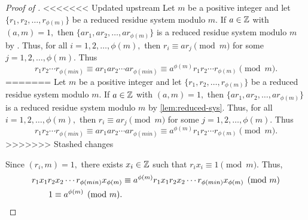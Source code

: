 \documentclass{ximera}
\begin{document}
\begin{proof}[Proof of ]
<<<<<<< Updated upstream
    Let $m$ be a positive integer and let $\{r_1,r_2,\dots,r_{\phi(m)}\}$ be a reduced residue system modulo $m.$ If $a\in\mathbb Z$ with $(a,m)=1,$ then $\{ar_1,ar_2,\dots,ar_{\phi(m)}\}$ is a reduced residue system modulo $m$ by . Thus, for all $i=1,2,\dots, \phi(m),$ then $r_i\equiv a r_j\pmod{m}$ for some $j=1,2,\dots,\phi(m).$ Thus \[r_1 r_2\cdots r_{\phi(min)}\equiv ar_1 ar_2\cdots ar_{\phi(min)}\equiv a^{\phi(m)}r_1 r_2\cdots r_{\phi(m)} \pmod{m}.\]
=======
    Let $m$ be a positive integer and let $\{r_1,r_2,\dots,r_{\phi(m)}\}$ be a reduced residue system modulo $m.$ If $a\in\mathbb Z$ with $(a,m)=1,$ then $\{ar_1,ar_2,\dots,ar_{\phi(m)}\}$ is a reduced residue system modulo $m$ by \cref{lem:reduced-sys}. Thus, for all $i=1,2,\dots, \phi(m),$ then $r_i\equiv a r_j\pmod{m}$ for some $j=1,2,\dots,\phi(m).$ Thus \[r_1 r_2\cdots r_{\phi(min)}\equiv ar_1 ar_2\cdots ar_{\phi(min)}\equiv a^{\phi(m)}r_1 r_2\cdots r_{\phi(m)} \pmod{m}.\]
>>>>>>> Stashed changes

    Since $(r_i,m)=1,$ there exists $x_i\in\mathbb Z$ such that $r_i x_i\equiv 1\pmod{m}.$ Thus, 
    \begin{align*}
        r_1 x_1 r_2 x_2\cdots r_{\phi(min)} x_{\phi(m)}&\equiv a^{\phi(m)} r_1 x_1 r_2 x_2\cdots r_{\phi(min)} x_{\phi(m)} \pmod{m}\\
        1\equiv a^{\phi(m)} \pmod{m}.\qedhere
    \end{align*}
\end{proof}
\end{document}
